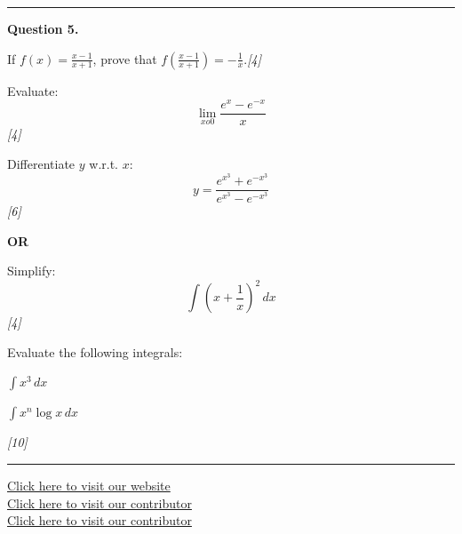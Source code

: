 \documentclass[11pt,a4paper]{article}
\newcommand{\pts}[1]{\hfill   \textit{[#1]}}
\begin{document}
\medskip\rule{\linewidth}{0.2pt}




\noindent   \textbf{Question 5.}

\begin{parts}
  \item If $f(x) = \frac{x-1}{x+1}$, prove that $f\left(\frac{x-1}{x+1}\right) = -\frac{1}{x}$.\pts{4}
  \item Evaluate:
  \[
  \lim_{x  o 0} \frac{e^x - e^{-x}}{x}
  \]\pts{4}
  \item Differentiate $y$ w.r.t. $x$:
  \[
  y = \frac{e^{x^3} + e^{-x^3}}{e^{x^3} - e^{-x^3}}
  \]\pts{6}
\end{parts}

\centerline{   \textbf{OR}}


\begin{parts}
  \item Simplify:
  \[
  \int \left(x + \frac{1}{x}\right)^2 \, dx
  \]\pts{4}
  \item Evaluate the following integrals:
  
\begin{parts}
    \item $\int x^3 \, dx$
    \item $\int x^n \log x \, dx$
  \end{parts}\pts{10}
\end{parts}

\vfill
\rule{\linewidth}{0.4pt}

\begin{center}\small
\href{https://bhu-exam.vercel.app/}{Click here to visit our website}\\[4pt]
\href{https://me-aryan.vercel.app/}{Click here to visit our contributor}\\[4pt]
\href{https://quashan-me.vercel.app/}{Click here to visit our contributor}
\end{center}
\end{document}
